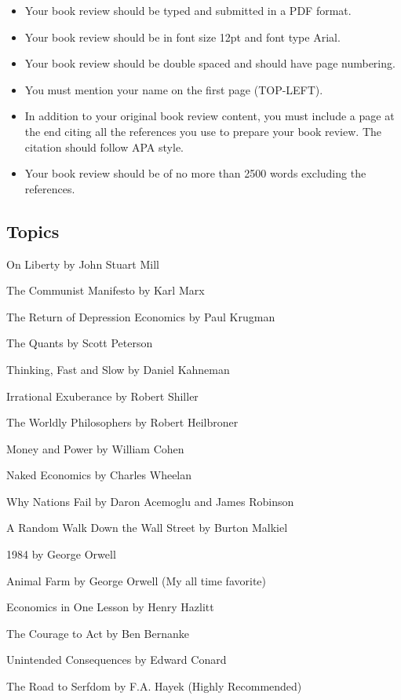 \documentclass[
]{article}
\begin{document}
\begin{itemize}
\item
  Your book review should be typed and submitted in a PDF format.
\item
  Your book review should be in font size 12pt and font type Arial.
\item
  Your book review should be double spaced and should have page
  numbering.
\item
  You must mention your name on the first page (TOP-LEFT).
\item
  In addition to your original book review content, you must include a
  page at the end citing all the references you use to prepare your book
  review. The citation should follow APA style.
\item
  Your book review should be of no more than 2500 words excluding the
  references.
\end{itemize}

\hypertarget{topics}{%
\subsection{Topics}\label{topics}}

On Liberty by John Stuart Mill

The Communist Manifesto by Karl Marx

The Return of Depression Economics by Paul Krugman

The Quants by Scott Peterson

Thinking, Fast and Slow by Daniel Kahneman

Irrational Exuberance by Robert Shiller

The Worldly Philosophers by Robert Heilbroner

Money and Power by William Cohen

Naked Economics by Charles Wheelan

Why Nations Fail by Daron Acemoglu and James Robinson

A Random Walk Down the Wall Street by Burton Malkiel

1984 by George Orwell

Animal Farm by George Orwell (My all time favorite)

Economics in One Lesson by Henry Hazlitt

The Courage to Act by Ben Bernanke

Unintended Consequences by Edward Conard

The Road to Serfdom by F.A. Hayek (Highly Recommended)
\end{document}
